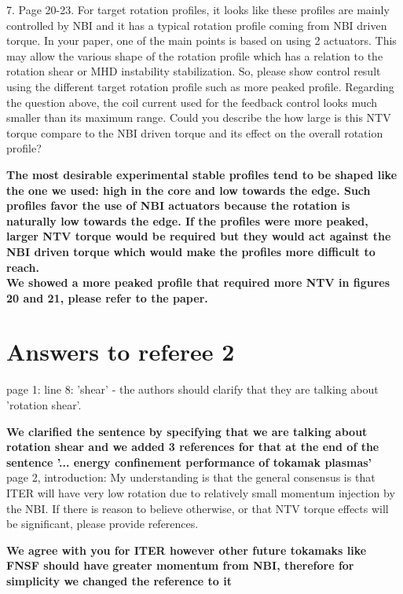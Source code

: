 \documentclass{scrartcl}
\newcommand{\response}[1]{\textcolor{red!80!black}{\bf #1}}
\begin{document}
7. Page 20-23.
For target rotation profiles, it looks like these profiles are mainly controlled by NBI and it has a typical rotation profile coming from NBI driven torque. In your paper, one of the main points is based on using 2 actuators. This may allow the various shape of the rotation profile which has a relation to the rotation shear or MHD instability stabilization. So, please show control result using the different target rotation profile such as more peaked profile.
Regarding the question above, the coil current used for the feedback control looks much smaller than its maximum range. Could you describe the how large is this NTV torque compare to the NBI driven torque and its effect on the overall rotation profile?

\response{The most desirable experimental stable profiles tend to be shaped like the one we used: high in the core and low towards the edge. Such profiles favor the use of NBI actuators because the rotation is naturally low towards the edge.
If the profiles were more peaked, larger NTV torque would be required but they would act against the NBI driven torque which would make the profiles more difficult to reach.\\
We showed a more peaked profile that required more NTV in figures 20 and 21, please refer to the paper.}




\section{Answers to referee 2}

page 1: line 8: 'shear' - the authors should clarify that they are talking about 'rotation shear'.

\response{We clarified the sentence by specifying that we are talking about rotation shear and we added 3 references for that at the end of the sentence { {'... energy confinement performance of tokamak plasmas'}} }\\

page 2, introduction: My understanding is that the general consensus is that ITER will have very low rotation due to relatively small momentum injection by the NBI. If there is reason to believe otherwise, or that NTV torque effects will be significant, please provide references.

\response{We agree with you for ITER however other future tokamaks like FNSF should have greater momentum from NBI, therefore for simplicity we changed the reference to it} \\
\end{document}
